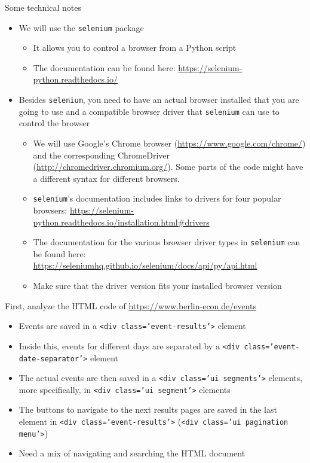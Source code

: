 \begin{frame}[fragile]{Some technical notes}
\begin{itemize}
	\item We will use the \texttt{selenium} package
	\begin{itemize}
		\item It allows you to control a browser from a Python script
		\item The documentation can be found here: \url{https://selenium-python.readthedocs.io/}
	\end{itemize}
	\item Besides \texttt{selenium}, you need to have an actual browser installed that you are going to use and a compatible browser driver that \texttt{selenium} can use to control the browser
	\begin{itemize}
		\item We will use Google's Chrome browser (\url{https://www.google.com/chrome/}) and the corresponding ChromeDriver (\url{http://chromedriver.chromium.org/}). Some parts of the code might have a different syntax for different browsers.
		\item \texttt{selenium}'s documentation includes links to drivers for four popular browsers: \url{https://selenium-python.readthedocs.io/installation.html#drivers}
		\item The documentation for the various browser driver types in \texttt{selenium} can be found here: \url{https://seleniumhq.github.io/selenium/docs/api/py/api.html}
		\item Make sure that the driver version fits your installed browser version
	\end{itemize}
\end{itemize}
\end{frame}

\begin{frame}[fragile]{First, analyze the HTML code of \url{https://www.berlin-econ.de/events}}
\begin{itemize}
	\item Events are saved in a \texttt{<div class='event-results'>} element
	\item Inside this, events for different days are separated by a \texttt{<div class='event-date-separator'>} element
	\item The actual events are then saved in a \texttt{<div class='ui segments'>} elements, more specifically, in \texttt{<div class='ui segment'>} elements
	\item The buttons to navigate to the next results pages are saved in the last element in \texttt{<div class='event-results'>} (\texttt{<div class='ui pagination menu'>})
	\item Need a mix of navigating and searching the HTML document
\end{itemize}
\end{frame}

